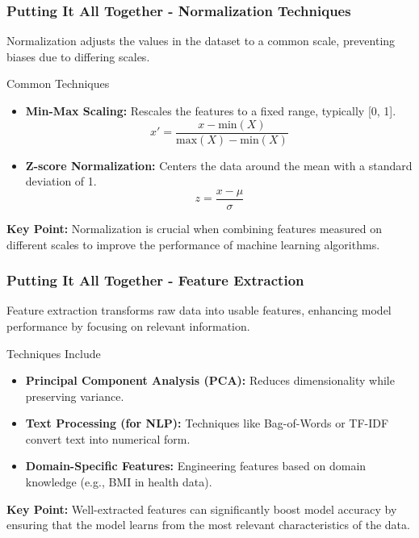 \documentclass[aspectratio=169]{beamer}
\begin{document}
\begin{frame}[fragile]
    \frametitle{Putting It All Together - Normalization Techniques}
    Normalization adjusts the values in the dataset to a common scale, preventing biases due to differing scales.

    \begin{block}{Common Techniques}
        \begin{itemize}
            \item \textbf{Min-Max Scaling:} Rescales the features to a fixed range, typically [0, 1].
            \begin{equation}
                x' = \frac{x - \text{min}(X)}{\text{max}(X) - \text{min}(X)}
            \end{equation}
            
            \item \textbf{Z-score Normalization:} Centers the data around the mean with a standard deviation of 1.
            \begin{equation}
                z = \frac{x - \mu}{\sigma}
            \end{equation}
        \end{itemize}
    \end{block}
    
    \textbf{Key Point:} Normalization is crucial when combining features measured on different scales to improve the performance of machine learning algorithms.
\end{frame}

\begin{frame}[fragile]
    \frametitle{Putting It All Together - Feature Extraction}
    Feature extraction transforms raw data into usable features, enhancing model performance by focusing on relevant information.

    \begin{block}{Techniques Include}
        \begin{itemize}
            \item \textbf{Principal Component Analysis (PCA):} Reduces dimensionality while preserving variance.
            \item \textbf{Text Processing (for NLP):} Techniques like Bag-of-Words or TF-IDF convert text into numerical form.
            \item \textbf{Domain-Specific Features:} Engineering features based on domain knowledge (e.g., BMI in health data).
        \end{itemize}
    \end{block}
    
    \textbf{Key Point:} Well-extracted features can significantly boost model accuracy by ensuring that the model learns from the most relevant characteristics of the data.
\end{frame}
\end{document}
